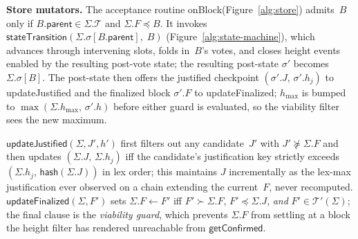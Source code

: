 \ifx\litemode\undefined\documentclass{article}\fi
\newcommand{\T}[0]{\ensuremath{\mathcal{T}}}
\newcommand{\parent}{\mathsf{parent}}
\newcommand{\hash}{\mathsf{hash}}
\newcommand{\hmax}{\ensuremath{h_{\max}}\xspace}
\newcommand{\viableTree}{\ensuremath{\mathcal{T}'}}
\newcommand{\stateTransition}{\textsf{stateTransition}\xspace}
\newcommand{\onBlock}{\textsf{onBlock}\xspace}
\newcommand{\updateJustified}{\textsf{updateJustified}\xspace}
\newcommand{\updateFinalized}{\textsf{updateFinalized}\xspace}
\newcommand{\getConfirmed}{\textsf{getConfirmed}\xspace}
\renewcommand{\paragraph}[1]{\vspace{7pt}\noindent\textbf{#1}}
\theoremstyle{plain}
\theoremstyle{definition}
\theoremstyle{remark}
\begin{document}
\paragraph{Store mutators.}
The acceptance routine \onBlock (Figure~\ref{alg:store}) admits~$B$ only if $B.\parent \in \Sigma.\T$ and $\Sigma.F \preceq B$.
It invokes $\stateTransition(\Sigma.\sigma[B.\parent],\; B)$ (Figure~\ref{alg:state-machine}), which advances through intervening slots, folds in~$B$'s votes, and closes height events enabled by the resulting post-vote state; the resulting post-state $\sigma'$ becomes $\Sigma.\sigma[B]$.
The post-state then offers the justified checkpoint $(\sigma'.J,\, \sigma'.h_j)$ to \updateJustified and the finalized block $\sigma'.F$ to \updateFinalized; $\hmax$ is bumped to $\max(\Sigma.\hmax,\, \sigma'.h)$ before either guard is evaluated, so the viability filter sees the new maximum.

$\updateJustified(\Sigma, J', h')$ first filters out any candidate~$J'$ with $J' \not\succeq \Sigma.F$ and then updates $(\Sigma.J,\, \Sigma.h_j)$ iff the candidate's justification key strictly exceeds $(\Sigma.h_j,\, \hash(\Sigma.J))$ in lex order; this maintains $J$ incrementally as the lex-max justification ever observed on a chain extending the current~$F$, never recomputed.
$\updateFinalized(\Sigma, F')$ sets $\Sigma.F \gets F'$ iff $F' \succ \Sigma.F$, $F' \preceq \Sigma.J$, \emph{and} $F' \in \viableTree(\Sigma)$; the final clause is the \emph{viability guard}, which prevents $\Sigma.F$ from settling at a block the height filter has rendered unreachable from $\getConfirmed$.
\end{document}
